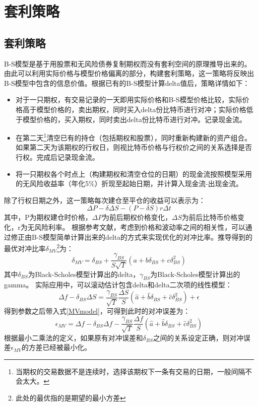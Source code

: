 \chapter{套利策略}

\section{套利策略}\label{strategy}
    B-S模型是基于用股票和无风险债券复制期权而没有套利空间的原理推导出来的。由此可以利用实际价格与模型价格偏离的部分，构建套利策略，这一策略将反映出B-S模型中包含的信息价值。根据已有的B-S模型计算delta值后，策略详情如下：
    \begin{itemize}
        \item 对于一只期权，有交易记录的一天即用实际价格和B-S模型价格比较，实际价格高于模型价格的，卖出期权，同时买入delta份比特币进行对冲；实际价格低于模型价格的，买入期权，同时卖出delta份比特币进行对冲。记录现金流。
        \item 在第二天\footnote{当期权的交易数据不是连续时，选择该期权下一条有交易的日期，一般间隔不会太大。}清空已有的持仓（包括期权和股票），同时重新构建新的资产组合。如果第二天为该期权的行权日，则视比特币价格与行权价之间的关系选择是否行权。完成后记录现金流。
        \item 将一只期权各个时点上（构建期权和清空仓位的日期）的现金流按照模型采用的无风险收益率（年化5$\%$）折现至起始日期，并计算入现金流-出现金流。
    \end{itemize}
    除了行权日期之外，这一策略每次建仓至平仓的收益可以表示为：
    \begin{equation}
        \Delta{P}-\delta{\Delta{S}}-(P-\delta{S})r\Delta{t}
    \end{equation}
    其中，P为期权建仓时价格，$\Delta{P}$为前后期权价格变化，$\Delta{S}$为前后比特币价格变化，r为无风险利率。
    根据参考文献\cite{Hull-2017}，考虑到价格和波动率之间的相关性，可以通过修正由B-S模型简单计算出来的delta的方式来实现优化的对冲比率。推导得到的最优对冲比率$\delta_{MV}$\footnote{此处的最优指的是期望的最小方差}为：
    \begin{equation}\label{MVmodel}
        \delta_{MV}=\delta_{BS}+\frac{\gamma_{BS}}{S\sqrt{T}}(a+b\delta_{BS}+c\delta^2_{BS})
    \end{equation}
    其中$\delta_{BS}$为Black-Scholes模型计算出的delta，$\gamma_{BS}$为Black-Scholes模型计算出的gamma。
    实际应用中，可以滚动估计包含delta和delta二次项的线性模型：
    \begin{equation}\label{MVreg}
        \Delta{f}-\delta_{BS}\Delta{S}=\frac{\gamma_{BS}}{\sqrt{T}}\frac{\Delta{S}}{S}(\hat{a}+\hat{b}\delta_{BS}+\hat{c}\delta^2_{BS})+\epsilon
    \end{equation}
    得到参数之后带入式\ref{MVmodel}，可得到此时的对冲误差为：
    \begin{equation}
        \epsilon_{MV}=\Delta{f}-\delta_{BS}\Delta{f}-\frac{\gamma_{BS}}{\sqrt{T}}\frac{\Delta{f}}{S}(\hat{a}+\hat{b}\delta_{BS}+\hat{c}\delta^2_{BS})
    \end{equation}
    根据最小二乘法的定义，如果原有对冲误差和$\delta_{BS}$之间的关系设定正确，则对冲误差$\epsilon_{MV}$的方差已经被最小化。
    
